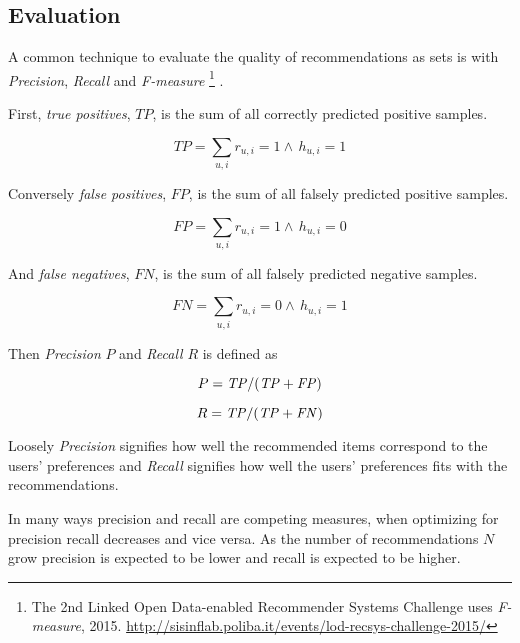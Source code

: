 
\subsection{Evaluation}\label{sec:background:theory:eval}

A common technique to evaluate the quality of recommendations as sets is with \textit{Precision}, \textit{Recall} and \textit{F-measure}
\footnote{The 2nd Linked Open Data-enabled Recommender Systems Challenge uses \textit{F-measure}, 2015. \url{http://sisinflab.poliba.it/events/lod-recsys-challenge-2015/}}
. \citep{bobadilla2013recommender}


First, \textit{true positives}, $TP$, is the sum of all correctly predicted positive samples.

\begin{equation} \label{eq:tp}
    TP = \sum_{u, i} r_{u, i} = 1 \land \, h_{u, i} = 1
\end{equation}

Conversely \textit{false positives}, $FP$, is the sum of all falsely predicted positive samples.

\begin{equation} \label{eq:fp}
    FP = \sum_{u, i} r_{u, i} = 1 \land \, h_{u, i} = 0
\end{equation}

And \textit{false negatives}, $FN$, is the sum of all falsely predicted negative samples.

\begin{equation} \label{eq:fn}
    FN = \sum_{u, i} r_{u, i} = 0 \land \, h_{u, i} = 1
\end{equation}

Then \textit{Precision} $P$ and \textit{Recall} $R$ is defined as

\begin{equation} \label{eq:precision}
    P = \mathit{TP} / (\mathit{TP} + \mathit{FP})
\end{equation}

\begin{equation} \label{eq:recall}
    R = \mathit{TP} / (\mathit{TP} + \mathit{FN})
\end{equation}

Loosely \textit{Precision} signifies how well the recommended items correspond to the users' preferences and \textit{Recall} signifies how well the users' preferences fits with the recommendations.

In many ways precision and recall are competing measures, when optimizing for precision recall decreases and vice versa.  As the number of recommendations $N$ grow precision is expected to be lower and recall is expected to be higher. \citep{hu2008collaborative}


